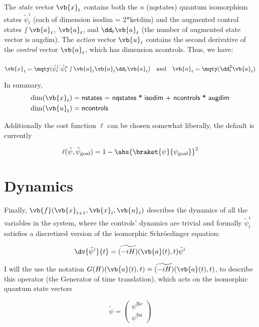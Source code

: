 \documentclass{article}
\newcommand{\isopsi}{\tilde \psi}
\begin{document}
The \textit{state} vector $\vb{x}_t$ contains both the $n$ (\textsf{nqstates}) quantum isomorphism states $\isopsi^i_t$ (each of dimension \textsf{isodim = 2*ketdim}) and the augmented control states $\smallint \vb{a}_t$, $\vb{a}_t$, and $\dd_t \vb{a}_t$ (the number of augmented state vector is \textsf{augdim}). The \textit{action} vector $\vb{u}_t$ contains the second derivative of the \textit{control} vector $\vb{a}_t$, which has dimension \textsf{ncontrols}. Thus, we have:

\begin{equation}
  \vb{x}_t = \mqty(
    \isopsi^1_t \\ 
    \vdots \\ 
    \isopsi^n_t \\ 
    \smallint \vb{a}_t \\ 
    \vb{a}_t \\ 
    \dd_t \vb{a}_t 
  )
  \quad \text{and} \quad 
  \vb{u}_t = \mqty(
    \dd^2_t \vb{a}_t
  )
\end{equation}

In summary, 
\begin{align*}
  \dim(\vb{x}_t) &= \textsf{nstates = nqstates * isodim + ncontrols * augdim} \\
  \dim(\vb{u}_t) &= \textsf{ncontrols}
\end{align*}

Additionally the cost function $\ell$ can be chosen somewhat liberally, the default is currently

$$
\ell(\isopsi, \isopsi_{\text{goal}}) = 1 - \abs{\braket{\psi}{\psi_\text{goal}}}^2
$$


\newpage
\section{Dynamics}

Finally, $\vb{f}(\vb{x}_{t+1}, \vb{x}_t, \vb{u}_t)$ describes the dynamics of all the variables in the system, where the controls' dynamics are trivial and formally $\isopsi^i_t$ satisfies a discretized version of the isomorphic Schr\"oedinger equation:

$$
\dv{\isopsi^i}{t} = \widetilde{(- i H)}(\vb{a}(t), t) \isopsi^i
$$

I will the use the notation $G(H)(\vb{a}(t), t) = \widetilde{(- i H)}(\vb{a}(t), t)$, to describe this operator (the Generator of time translation), which acts on the isomorphic quantum state vectors 

$$
\isopsi = \begin{pmatrix} \psi^{\mathrm{Re}} \\ \psi^{\mathrm{Im}} \end{pmatrix}
$$ 
\end{document}
